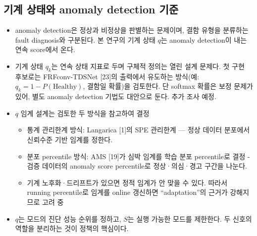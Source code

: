 \documentclass[10pt]{article}
\begin{document}
\subsection{기계 상태와 anomaly detection 기준}
\begin{itemize}
\item anomaly detection은 정상과 비정상을 판별하는 문제이며, 결함 유형을 분류하는 fault diagnosis와 구분된다. 본 연구의 기계 상태 $q$는 anomaly detection이 내는 연속 score에서 온다.
\item 기계 상태 $q_k$는 연속 상태 지표로 두며 구체적 정의는 열린 설계 문제다. 첫 구현 후보로는 FRFconv-TDSNet [23]의 출력에서 유도하는 방식(예: $q_k = 1 - P(\text{Healthy})$, 결함일 확률)을 검토한다. 단 softmax 확률은 보정 문제가 있어, 별도 anomaly detection 기법도 대안으로 둔다. 추가 조사 예정.
\item $q$ 임계 설계는 검토한 두 방식을 참고하여 결정
\begin{itemize}
\item 통계 관리한계 방식: Langarica [1]의 SPE 관리한계 --- 정상 데이터 분포에서 신뢰수준 기반 임계를 정한다.
\item 분포 percentile 방식: AMS [19]가 심박 임계를 학습 분포 percentile로 결정 - 검증 데이터의 anomaly score percentile로 정상·의심·경고 구간을 나눈다.
\item 기계 노후화·드리프트가 있으면 정적 임계가 안 맞을 수 있다. 따라서 running percentile로 임계를 online 갱신하면 ``adaptation''의 근거가 강해지므로 고려 중
\end{itemize}
\item $q$는 모드의 진단 성능 순위를 정하고, $S$는 실행 가능한 모드를 제한한다. 두 신호의 역할을 분리하는 것이 정책의 핵심이다.
\end{itemize}
\end{document}
